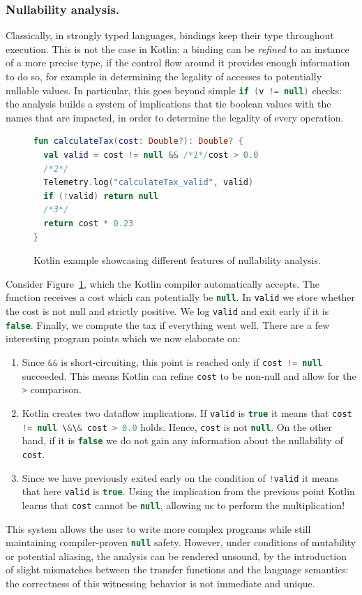 \documentclass[runningheads]{llncs}
\newcommand{\kt}[1]{\lstinline[language=Kotlin]|#1|}
\begin{document}
\subsubsection{Nullability analysis.}
Classically, in strongly typed languages, bindings keep their type throughout execution. This is not the case in Kotlin: a binding can be \emph{refined} to an instance of a more precise type, if the control flow around it provides enough information to do so, for example in determining the legality of accesses to potentially nullable values. In particular, this goes beyond simple \kt{if (v != null)} checks: the analysis builds a system of implications that tie boolean values with the names that are impacted, in order to determine the legality of every operation.

\begin{figure}[t]
\begin{lstlisting}[language=Kotlin]
fun calculateTax(cost: Double?): Double? {
  val valid = cost != null && /*1*/cost > 0.0
  /*2*/
  Telemetry.log("calculateTax_valid", valid)
  if (!valid) return null
  /*3*/
  return cost * 0.23
}
\end{lstlisting}
\caption{Kotlin example showcasing different features of nullability analysis.}
\label{lst:nullability-example}
\end{figure}

Consider Figure~\ref{lst:nullability-example}, which the Kotlin compiler automatically accepts. The function receives a cost which can potentially be \kt{null}. In \kt{valid} we store whether the cost is not null and strictly positive. We log \kt{valid} and exit early if it is \kt{false}. Finally, we compute the tax if everything went well. There are a few interesting program points which we now elaborate on:
\begin{enumerate}
  \item Since \kt{&&} is short-circuiting, this point is reached only if \kt{cost != null} succeeded. This means Kotlin can refine \kt{cost} to be non-null and allow for the \kt{>} comparison.
  \item Kotlin creates two dataflow implications. If \kt{valid} is \kt{true} it means that \kt{cost != null \&\& cost > 0.0} holds. Hence, \kt{cost} is not \kt{null}. On the other hand, if it is \kt{false} we do not gain any information about the nullability of \kt{cost}.
  \item Since we have previously exited early on the condition of \kt{!valid} it means that here \kt{valid} is \kt{true}. Using the implication from the previous point Kotlin learns that \kt{cost} cannot be \kt{null}, allowing us to perform the multiplication!
\end{enumerate}
This system allows the user to write more complex programs while still maintaining compiler-proven \kt{null} safety. However, under conditions of mutability or potential aliasing, the analysis can be rendered unsound, by the introduction of slight mismatches between the transfer functions and the language semantics: the correctness of this witnessing behavior is not immediate and unique.
\end{document}
